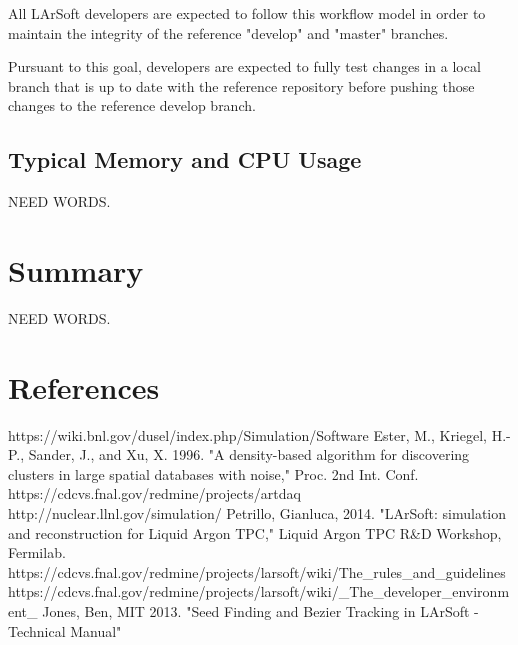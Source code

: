 \documentclass[12pt]{elsarticle}
\begin{document}
All LArSoft developers are expected to follow this workflow model in order to maintain the integrity of the reference "develop" and "master" branches.

Pursuant to this goal, developers are expected to fully test changes in a local branch that is up to date with the reference repository before pushing those changes to the reference develop branch. 
\subsection{Typical Memory and CPU Usage}
NEED WORDS.

\section{Summary}
NEED WORDS.
\section{References}

\begin{thebibliography}{99}
 https://wiki.bnl.gov/dusel/index.php/Simulation/Software
 Ester, M., Kriegel, H.-P., Sander, J., and Xu, X. 1996. "A density-based algorithm for discovering clusters in large spatial databases with noise," Proc. 2nd Int. Conf.
 https://cdcvs.fnal.gov/redmine/projects/artdaq
 http://nuclear.llnl.gov/simulation/
 Petrillo, Gianluca, 2014. "LArSoft: simulation and reconstruction for Liquid Argon TPC," Liquid Argon TPC R\&D Workshop, Fermilab.
 https://cdcvs.fnal.gov/redmine/projects/larsoft/wiki/The\_rules\_and\_guidelines
https://cdcvs.fnal.gov/redmine/projects/larsoft/wiki/\_The\_developer\_environment\_
 Jones, Ben, MIT 2013. "Seed Finding and Bezier Tracking in LArSoft - Technical Manual"
\end{thebibliography}
\clearpage 
\end{document}
